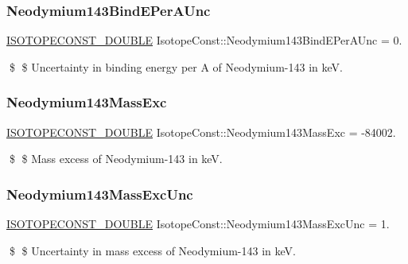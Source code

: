 \subsubsection{\texorpdfstring{Neodymium143\+Bind\+E\+Per\+A\+Unc}{Neodymium143BindEPerAUnc}}
{\footnotesize\ttfamily \mbox{\hyperlink{group___isotope_const-_macros_ga8f45a7272ce02c0b4c65c44636ed719a}{I\+S\+O\+T\+O\+P\+E\+C\+O\+N\+S\+T\+\_\+\+D\+O\+U\+B\+LE}} Isotope\+Const\+::\+Neodymium143\+Bind\+E\+Per\+A\+Unc = 0.}

\$ \$ Uncertainty in binding energy per A of Neodymium-\/143 in keV. \mbox{\label{group___isotope_const-_neodymium-_nd143_ga3291586f0d51bafefdee5dc4e39241bc}} 
\subsubsection{\texorpdfstring{Neodymium143\+Mass\+Exc}{Neodymium143MassExc}}
{\footnotesize\ttfamily \mbox{\hyperlink{group___isotope_const-_macros_ga8f45a7272ce02c0b4c65c44636ed719a}{I\+S\+O\+T\+O\+P\+E\+C\+O\+N\+S\+T\+\_\+\+D\+O\+U\+B\+LE}} Isotope\+Const\+::\+Neodymium143\+Mass\+Exc = -\/84002.}

\$ \$ Mass excess of Neodymium-\/143 in keV. \mbox{\label{group___isotope_const-_neodymium-_nd143_ga83bc70bc8ef9b3ce7fbb947c95b3fea9}} 
\subsubsection{\texorpdfstring{Neodymium143\+Mass\+Exc\+Unc}{Neodymium143MassExcUnc}}
{\footnotesize\ttfamily \mbox{\hyperlink{group___isotope_const-_macros_ga8f45a7272ce02c0b4c65c44636ed719a}{I\+S\+O\+T\+O\+P\+E\+C\+O\+N\+S\+T\+\_\+\+D\+O\+U\+B\+LE}} Isotope\+Const\+::\+Neodymium143\+Mass\+Exc\+Unc = 1.}

\$ \$ Uncertainty in mass excess of Neodymium-\/143 in keV. \mbox{\label{group___isotope_const-_neodymium-_nd143_ga3d3126e58f4d50ce2eca798b26a3b59c}} 
